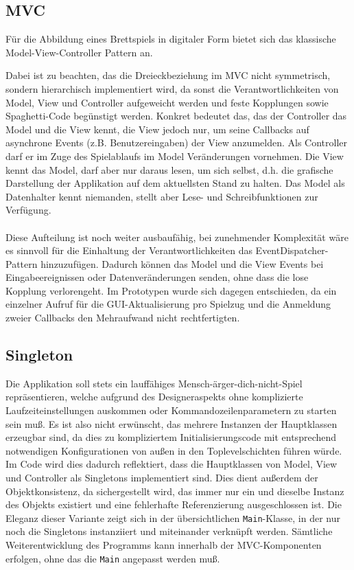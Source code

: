 \documentclass[conference]{IEEEtran}
\begin{document}
\subsection{MVC}
  F\"ur die Abbildung eines Brettspiels in digitaler Form bietet sich das klassische Model-View-Controller Pattern an.

  Dabei ist zu beachten, das die Dreieckbeziehung im MVC nicht symmetrisch, sondern hierarchisch implementiert wird, da sonst die Verantwortlichkeiten
  von Model, View und Controller aufgeweicht werden und feste Kopplungen sowie Spaghetti-Code beg\"unstigt werden. Konkret bedeutet das, das der Controller das Model und die View kennt, die View jedoch nur, um seine Callbacks auf asynchrone Events (z.B. Benutzereingaben) der View anzumelden. Als Controller darf er im Zuge des Spielablaufs im Model Ver\"anderungen vornehmen. Die View kennt das Model, darf aber nur daraus lesen, um sich selbst, d.h. die grafische Darstellung der Applikation auf dem aktuellsten Stand zu halten. Das Model als Datenhalter kennt niemanden, stellt aber Lese- und Schreibfunktionen zur Verf\"ugung. \\\\
  Diese Aufteilung ist noch weiter ausbauf\"ahig, bei zunehmender Komplexit\"at w\"are es sinnvoll f\"ur die
  Einhaltung der Verantwortlichkeiten das EventDispatcher-Pattern hinzuzuf\"ugen. Dadurch k\"onnen das Model und die View Events bei Eingabeereignissen oder Datenver\"anderungen senden, ohne dass die lose Kopplung verlorengeht. Im Prototypen wurde sich dagegen entschieden, da ein einzelner Aufruf f\"ur die GUI-Aktualisierung pro Spielzug und die Anmeldung zweier Callbacks den Mehraufwand nicht rechtfertigten.

\subsection{Singleton}

Die Applikation soll stets ein lauff\"ahiges Mensch-\"arger-dich-nicht-Spiel repr\"asentieren, welche aufgrund des Designeraspekts ohne komplizierte Laufzeiteinstellungen auskommen oder Kommandozeilenparametern zu starten sein mu\ss. Es ist also nicht erw\"unscht, das mehrere Instanzen der Hauptklassen erzeugbar sind, da dies zu kompliziertem Initialisierungscode mit entsprechend notwendigen Konfigurationen von au\ss en in den Toplevelschichten f\"uhren w\"urde. Im Code wird dies dadurch reflektiert, dass die Hauptklassen von Model, View und Controller als Singletons implementiert sind. Dies dient au{\ss}erdem der Objektkonsistenz, da sichergestellt wird, das immer nur ein und dieselbe Instanz des Objekts existiert und eine fehlerhafte Referenzierung ausgeschlossen ist.
Die Eleganz dieser Variante zeigt sich in der \"ubersichtlichen \texttt{Main}-Klasse, in der nur noch die Singletons instanziiert und miteinander verkn\"upft werden. S\"amtliche Weiterentwicklung des Programms kann innerhalb der MVC-Komponenten erfolgen, ohne das die \texttt{Main} angepasst werden mu\ss .
\end{document}
